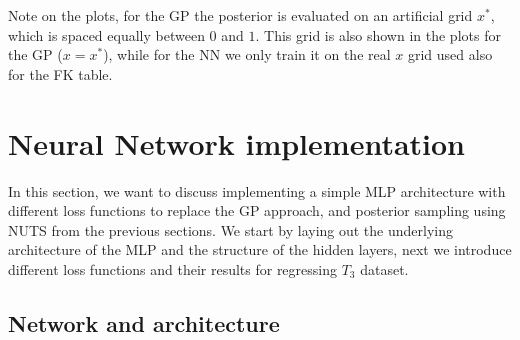 \documentclass[11pt,a4paper]{article}
\begin{document}
Note on the plots, for the GP the posterior is evaluated on an artificial grid $x^*$, which is spaced equally between $0$ and $1$. This grid is also shown in the plots for the GP ($x=x^*$), while for the NN we only train it on the real $x$ grid used also for the FK table.
%
\section{Neural Network implementation}

In this section, we want to discuss implementing a simple MLP architecture with different loss functions to replace the GP approach, and posterior sampling using NUTS from the previous sections.
We start by laying out the underlying architecture of the MLP and the structure of the hidden layers, next we introduce different loss functions and their results for regressing $T_3$ dataset. 
\subsection{Network and architecture}
\end{document}

